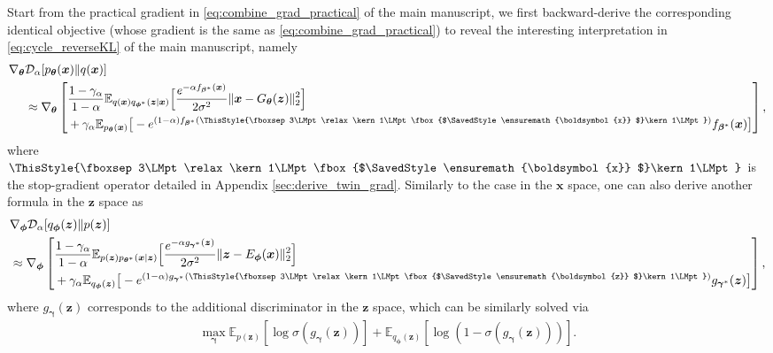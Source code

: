 \documentclass[letterpaper]{article} %
\newcommand{\bali}{\begin{aligned}}
\newcommand{\eali}{\end{aligned}}
\newcommand{\Dc}[0]{\ensuremath{\mathcal{D}} }
\newcommand{\Ebb}[0]{\ensuremath{\mathbb{E}} }
\newcommand{\xv}[0]{\ensuremath{\boldsymbol{x}} }
\newcommand{\zv}[0]{\ensuremath{\boldsymbol{z}} }
\newcommand{\betav}[0]{\ensuremath{\boldsymbol{\beta}} }
\newcommand{\gammav}[0]{\ensuremath{\boldsymbol{\gamma}} }
\newcommand{\thetav}[0]{\ensuremath{\boldsymbol{\theta}} }
\newcommand{\phiv}[0]{\ensuremath{\boldsymbol{\phi}} }
\newcommand\mathbox[1]{\mathord{\ThisStyle{%
			\fboxsep3\LMpt\relax\kern1\LMpt\fbox{$\SavedStyle#1$}\kern1\LMpt}}}
\begin{document}
Start from the practical gradient in \eqref{eq:combine_grad_practical} of the main manuscript, we first backward-derive the corresponding identical objective (whose gradient is the same as \eqref{eq:combine_grad_practical}) to reveal the interesting interpretation in \eqref{eq:cycle_reverseKL} of the main manuscript, namely
\begin{equation}\label{eq:app_cycle_1}
\begin{aligned}
\nabla_{\thetav} & \Dc_{\alpha} [p_{\thetav}(\xv) \| q(\xv)]
    \\
    & 
\approx \nabla_{\thetav} \left[
\bali
& \frac{1 - \gamma_{\alpha}}{1 - \alpha}
\Ebb_{q(\xv) q_{\phiv^{*}}(\zv|\xv)} \Big[ 
\frac{e^{- \alpha f_{\betav^{*}}(\xv)}}{ 2\sigma^2}
\| \xv - G_{\thetav}(\zv) \|_2^2
\Big] 
\\
& + \gamma_{\alpha} \Ebb_{p_{\thetav}(\xv)} \big[
-e^{(1 - \alpha) f_{\betav^{*}}(\mathbox{\xv})}
f_{\betav^{*}}(\xv) 
\big]
\eali
\right],
\end{aligned}
\end{equation}
where $\mathbox{\xv}$ is the stop-gradient operator detailed in Appendix \ref{sec:derive_twin_grad}.
Similarly to the case in the $\xv$ space, one can also derive another formula in the $\zv$ space as 
\begin{equation}\label{eq:app_cycle_2}
\begin{aligned}
    & \nabla_{\phiv} \Dc_{\alpha} [q_{\phiv}(\zv) \| p(\zv)]
    \\
    & 
    \approx \nabla_{\phiv} \left[
    \bali
        & \frac{1 - \gamma_{\alpha}}{1 - \alpha} \Ebb_{p(\zv) p_{\thetav^{*}}(\xv|\zv)} \Big[ 
        \frac{e^{- \alpha g_{\gammav^{*}}(\zv)}}{2\sigma^2}
        \| \zv - E_{\phiv}(\xv) \|_2^2
        \Big] 
        \\
        &  + \gamma_{\alpha} \Ebb_{q_{\phiv}(\zv)} \big[
        -e^{(1 - \alpha) g_{\gammav^{*}}(\mathbox{\zv})}
        g_{\gammav^{*}}(\zv)
        \big]
    \eali
    \right],
\end{aligned}
\end{equation}
where $g_{\gammav}(\zv)$ corresponds to the additional discriminator in the $\zv$ space, which can be similarly solved via
\begin{equation}\label{eq:}
\begin{aligned}
\max_{\gammav} \Ebb_{p(\zv)} [\log \sigma(g_{\gammav}(\zv))]
+ \Ebb_{q_{\phiv} (\zv)} [\log (1-\sigma(g_{\gammav}(\zv))) ].
\end{aligned}
\end{equation}
\end{document}
